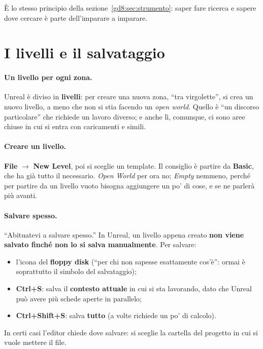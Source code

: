 È lo stesso principio della sezione~\ref{gd8:sec:strumento}: saper fare
ricerca e sapere dove cercare è parte dell'imparare a imparare.

\section{I livelli e il salvataggio}
\label{gd8:sec:livelli}

\paragraph{Un livello per ogni zona.} Unreal è diviso in \textbf{livelli}: per
creare una nuova zona, ``tra virgolette'', si crea un nuovo livello, a meno che
non si stia facendo un \emph{open world}. Quello è ``un discorso particolare''
che richiede un lavoro diverso; e anche lì, comunque, ci sono aree chiuse in
cui si entra con caricamenti e simili.

\paragraph{Creare un livello.} \textbf{File} $\rightarrow$ \textbf{New Level},
poi si sceglie un template. Il consiglio è partire da \textbf{Basic}, che ha
già tutto il necessario. \emph{Open World} per ora no; \emph{Empty} nemmeno,
perché per partire da un livello vuoto bisogna aggiungere un po' di cose, e se
ne parlerà più avanti.

\paragraph{Salvare spesso.} ``Abituatevi a salvare spesso.'' In Unreal, un
livello appena creato \textbf{non viene salvato finché non lo si salva
manualmente}. Per salvare:
\begin{itemize}
  \item l'icona del \textbf{floppy disk} (``per chi non sapesse esattamente
        cos'è'': ormai è soprattutto il simbolo del salvataggio);
  \item \textbf{Ctrl+S}: salva il \textbf{contesto attuale} in cui si sta
        lavorando, dato che Unreal può avere più schede aperte in parallelo;
  \item \textbf{Ctrl+Shift+S}: salva \textbf{tutto} (a volte richiede un po'
        di calcolo).
\end{itemize}
In certi casi l'editor chiede dove salvare: si sceglie la cartella del
progetto in cui si vuole mettere il file.

